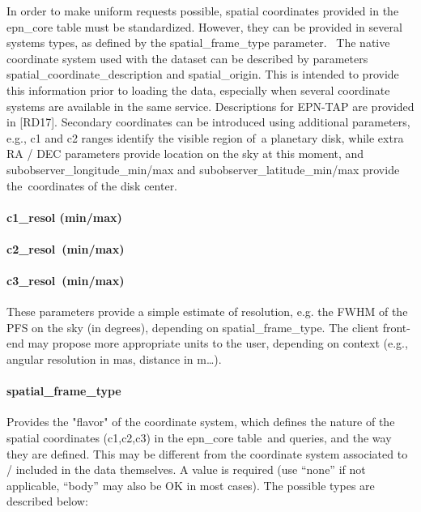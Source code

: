 \documentclass[11pt,a4paper]{ivoa}
\begin{document}
In order to make uniform requests possible, spatial coordinates provided in the epn\_core table must be standardized. However, they can be provided in several systems types, as defined by the spatial\_frame\_type parameter.  The native coordinate system used with the dataset can be described by parameters spatial\_coordinate\_description and spatial\_origin. This is intended to provide this information prior to loading the data, especially when several coordinate systems are available in the same service. Descriptions for EPN-TAP are provided in [RD17]. Secondary coordinates can be introduced using additional parameters, e.g., c1 and c2 ranges identify the visible region of a planetary disk, while extra RA / DEC parameters provide location on the sky at this moment, and subobserver\_longitude\_min/max and subobserver\_latitude\_min/max provide the coordinates of the disk center.

\paragraph{c1\_resol (min/max)}

\paragraph{c2\_resol (min/max)}

\paragraph{c3\_resol (min/max)}

These parameters provide a simple estimate of resolution, e.g. the FWHM of the PFS on the sky (in degrees), depending on spatial\_frame\_type. The client front-end may propose more appropriate units to the user, depending on context (e.g., angular resolution in mas, distance in m…).

\paragraph{spatial\_frame\_type}

Provides the "flavor" of the coordinate system, which defines the nature of the spatial coordinates (c1,c2,c3) in the epn\_core table and queries, and the way they are defined. This may be different from the coordinate system associated to / included in the data themselves. A value is required (use ``none'' if not applicable, ``body'' may also be OK in most cases). The possible types are described below:
\end{document}
